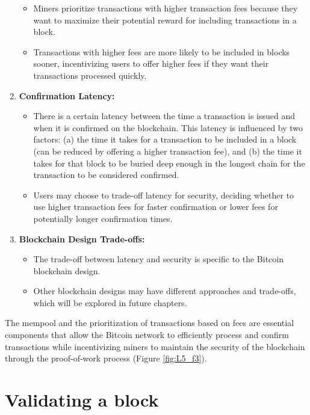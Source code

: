 \begin{enumerate}
\begin{itemize}
		\item Miners prioritize transactions with higher transaction fees because they want to maximize their potential reward for including transactions in a block.
		\item Transactions with higher fees are more likely to be included in blocks sooner, incentivizing users to offer higher fees if they want their transactions processed quickly.
	\end{itemize}
	\item \textbf{Confirmation Latency:}
	\begin{itemize}
		\item There is a certain latency between the time a transaction is issued and when it is confirmed on the blockchain. This latency is influenced by two factors: (a) the time it takes for a transaction to be included in a block (can be reduced by offering a higher transaction fee), and (b) the time it takes for that block to be buried deep enough in the longest chain for the transaction to be considered confirmed.
		\item Users may choose to trade-off latency for security, deciding whether to use higher transaction fees for faster confirmation or lower fees for potentially longer confirmation times.
	\end{itemize}
	\item \textbf{Blockchain Design Trade-offs:}
	\begin{itemize}
		\item The trade-off between latency and security is specific to the Bitcoin blockchain design.
		\item Other blockchain designs may have different approaches and trade-offs, which will be explored in future chapters.
	\end{itemize}
\end{enumerate}
The mempool and the prioritization of transactions based on fees are essential components that allow the Bitcoin network to efficiently process and confirm transactions while incentivizing miners to maintain the security of the blockchain through the proof-of-work process (Figure \ref{fig:L5_f3}).

\section{Validating a block}
